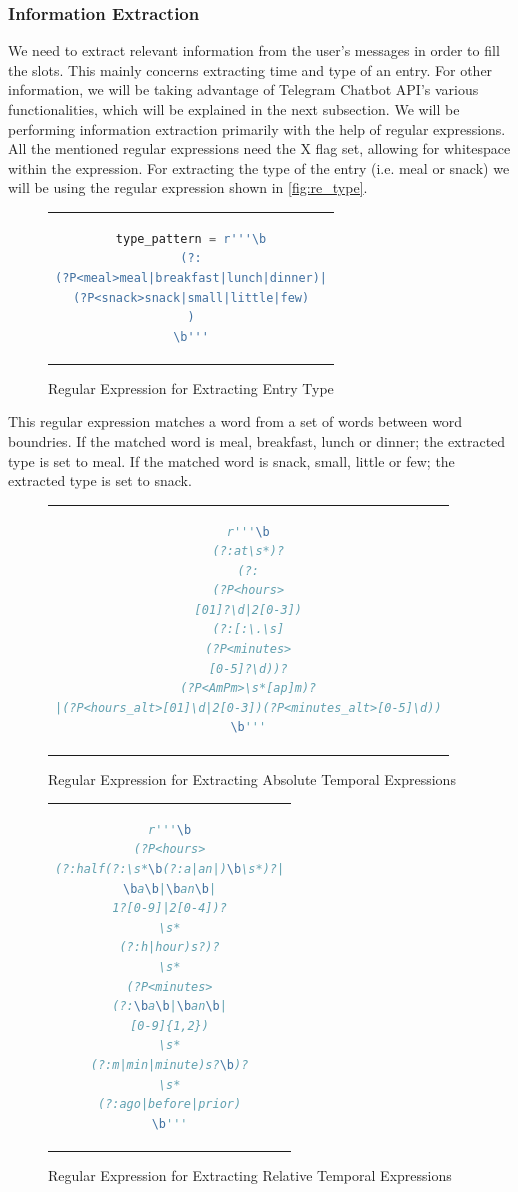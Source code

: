 \subsubsection{Information Extraction}
We need to extract relevant information from the user's messages in order to fill the slots.
This mainly concerns extracting time and type of an entry.
For other information, we will be taking advantage of Telegram Chatbot API's various functionalities, which will be explained in the next subsection.
We will be performing information extraction primarily with the help of regular expressions.
All the mentioned regular expressions need the X flag set, allowing for whitespace within the expression.
For extracting the type of the entry (i.e. meal or snack) we will be using the regular expression shown in \autoref{fig:re_type}.

\begin{figure}[htpb]
  \centering
  \begin{tabular}{c}
  \begin{lstlisting}[language=python]
type_pattern = r'''\b
(?:
(?P<meal>meal|breakfast|lunch|dinner)|
(?P<snack>snack|small|little|few)
)
\b'''
  \end{lstlisting}
  \end{tabular}
  \caption[Regular Expression for Extracting Entry Type]{Regular Expression for Extracting Entry Type}
  \label{fig:re_type}
\end{figure}

This regular expression matches a word from a set of words between word boundries.
If the matched word is meal, breakfast, lunch or dinner; the extracted type is set to meal.
If the matched word is snack, small, little or few; the extracted type is set to snack.


\begin{figure}[htpb]
  \centering
  \begin{tabular}{c}
  \begin{lstlisting}[language=python]
r'''\b
(?:at\s*)?
(?:
(?P<hours>
[01]?\d|2[0-3])
(?:[:\.\s]
(?P<minutes>
[0-5]?\d))?
(?P<AmPm>\s*[ap]m)?
|(?P<hours_alt>[01]\d|2[0-3])(?P<minutes_alt>[0-5]\d))
\b'''
  \end{lstlisting}
  \end{tabular}
  \caption[Regular Expression for Extracting Absolute Temporal Expressions]{Regular Expression for Extracting Absolute Temporal Expressions}
  \label{fig:re_time_a}
\end{figure}

\begin{figure}[htpb]
  \centering
  \begin{tabular}{c}
  \begin{lstlisting}[language=python]
r'''\b
(?P<hours>
(?:half(?:\s*\b(?:a|an|)\b\s*)?|
\ba\b|\ban\b|
1?[0-9]|2[0-4])?
\s*
(?:h|hour)s?)?
\s*
(?P<minutes>
(?:\ba\b|\ban\b|
[0-9]{1,2})
\s*
(?:m|min|minute)s?\b)?
\s*
(?:ago|before|prior)
\b'''
  \end{lstlisting}
  \end{tabular}
  \caption[Regular Expression for Extracting Relative Temporal Expressions]{Regular Expression for Extracting Relative Temporal Expressions}
  \label{fig:re_time_r}
\end{figure}

